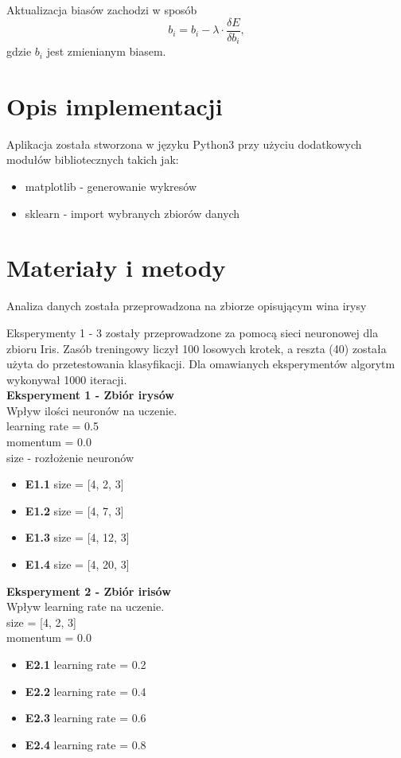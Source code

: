 \documentclass{classrep}
\begin{document}
Aktualizacja biasów zachodzi w sposób
\begin{equation} \label{eq:generalBackPropagationBias}
	b_i = b_i - \lambda \cdot \frac{\delta E}{\delta b_i},
\end{equation}
gdzie $b_i$ jest zmienianym biasem.

\section{Opis implementacji}
Aplikacja została stworzona w języku Python3 przy użyciu dodatkowych modułów bibliotecznych takich jak:
		\begin{itemize}
			\item matplotlib - generowanie wykresów
			\item sklearn - import wybranych zbiorów danych
		\end{itemize}

\section{Materiały i metody}
Analiza danych została przeprowadzona na zbiorze opisującym wina irysy \cite{irisdataset}


Eksperymenty 1 - 3 zostały przeprowadzone za pomocą sieci neuronowej dla zbioru Iris. Zasób treningowy liczył 100 losowych krotek, a reszta (40) została użyta do przetestowania klasyfikacji. Dla omawianych eksperymentów algorytm wykonywał 1000 iteracji.\\


\textbf{Eksperyment 1 - Zbiór irysów}\\
		Wpływ ilości neuronów na uczenie.\\
		learning rate = 0.5\\
		momentum = 0.0\\
		size - rozłożenie neuronów
		\begin{itemize}
			\item \textbf{E1.1}
			 size = [4, 2, 3]
			\item \textbf{E1.2} 
			size = [4, 7, 3]
			\item \textbf{E1.3}
			size = [4, 12, 3]
			\item \textbf{E1.4}
			size = [4, 20, 3]
		\end{itemize}
	
	\textbf{Eksperyment 2 - Zbiór irisów}\\
		Wpływ learning rate na uczenie.\\
		size = [4, 2, 3]\\
		momentum =  0.0
		\begin{itemize}
			\item \textbf{E2.1}
			 learning rate = 0.2
			\item \textbf{E2.2} 
			learning rate = 0.4
			\item \textbf{E2.3}
			learning rate = 0.6
			\item \textbf{E2.4}
			learning rate = 0.8
		\end{itemize}
	
\end{document}
